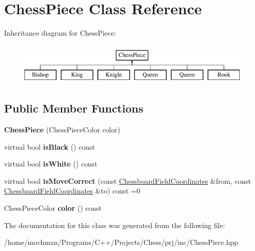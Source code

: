 \hypertarget{class_chess_piece}{\section{Chess\-Piece Class Reference}
\label{class_chess_piece}
}
Inheritance diagram for Chess\-Piece\-:\begin{figure}[H]
\begin{center}
\leavevmode
\includegraphics[height=2.000000cm]{class_chess_piece}
\end{center}
\end{figure}
\subsection*{Public Member Functions}
\begin{DoxyCompactItemize}
\item 
\hypertarget{class_chess_piece_a7bda0d20c33840ea8d2fda7d45e33f02}{{\bfseries Chess\-Piece} (Chess\-Piece\-Color color)}\label{class_chess_piece_a7bda0d20c33840ea8d2fda7d45e33f02}

\item 
\hypertarget{class_chess_piece_a0ed5afd2f93106d117df11d1cbf5de5c}{virtual bool {\bfseries is\-Black} () const }\label{class_chess_piece_a0ed5afd2f93106d117df11d1cbf5de5c}

\item 
\hypertarget{class_chess_piece_a4852b0cc8cf2ce3498eed435690c742e}{virtual bool {\bfseries is\-White} () const }\label{class_chess_piece_a4852b0cc8cf2ce3498eed435690c742e}

\item 
\hypertarget{class_chess_piece_a1a2502ca9babe66290dddd6f32907864}{virtual bool {\bfseries is\-Move\-Correct} (const \hyperlink{class_chessboard_field_coordinates}{Chessboard\-Field\-Coordinates} \&from, const \hyperlink{class_chessboard_field_coordinates}{Chessboard\-Field\-Coordinates} \&to) const =0}\label{class_chess_piece_a1a2502ca9babe66290dddd6f32907864}

\item 
\hypertarget{class_chess_piece_abe4122c1f00150b7d64ac3c6288e7950}{Chess\-Piece\-Color {\bfseries color} () const }\label{class_chess_piece_abe4122c1f00150b7d64ac3c6288e7950}

\end{DoxyCompactItemize}


The documentation for this class was generated from the following file\-:\begin{DoxyCompactItemize}
\item 
/home/mochman/\-Programs/\-C++/\-Projects/\-Chess/prj/inc/Chess\-Piece.\-hpp\end{DoxyCompactItemize}
